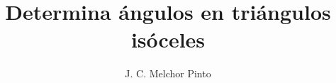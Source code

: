 \documentclass[12pt]{guia}
\title{Determina ángulos en triángulos isóceles}
\author{J. C. Melchor Pinto}
\begin{document}
\pagestyle{headandfoot}
\addpoints
\INFO
\printanswers

% 
% 
% 
% 
\newpage
\begin{questions}
    
    
    \newpage
    
    
    \newpage
    
    
    \newpage
    
    
    \newpage
    
    
    \newpage
    
    
    \newpage
    
\end{questions}
\end{document}
